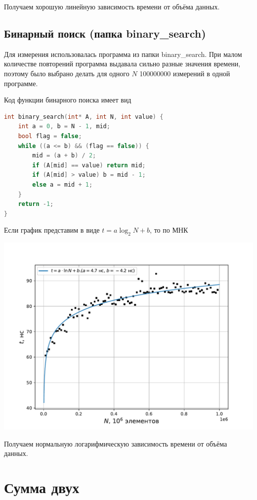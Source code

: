 \documentclass[a4paper,12pt]{article}
\begin{document}
Получаем хорошую линейную зависимость времени от объёма данных.


\subsection*{Бинарный поиск (папка binary\_search)}
Для измерения использовалась программа из папки binary\_search. При малом количестве повторений программа выдавала сильно разные значения времени, поэтому было выбрано делать для одного $N$ 100000000 измерений в одной программе.

Код функции бинарного поиска имеет вид
\begin{lstlisting}[language=C++]
int binary_search(int* A, int N, int value) {
	int a = 0, b = N - 1, mid;
	bool flag = false;
	while ((a <= b) && (flag == false)) {
		mid = (a + b) / 2;
		if (A[mid] == value) return mid;
		if (A[mid] > value) b = mid - 1;
		else a = mid + 1;
	}
	return -1;
}
\end{lstlisting}



Если график представим в виде $t = a \log_2 N + b$,  то по МНК


\begin{center}
\includegraphics[scale=1]{Figure_2.pdf}
\end{center}

Получаем нормальную логарифмическую зависимость времени от объёма данных.

\section*{Сумма двух}
\end{document}
